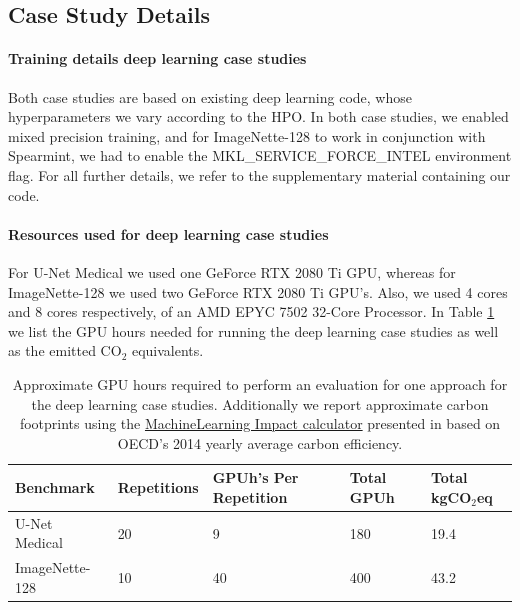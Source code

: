 \subsection{Case Study Details}

\paragraph{Training details deep learning case studies} Both case studies are based on existing deep learning code, whose hyperparameters we vary according to the HPO. In both case studies, we enabled mixed precision training, and for ImageNette-128 to work in conjunction with Spearmint, we had to enable the MKL\_SERVICE\_FORCE\_INTEL environment flag. For all further details, we refer to the supplementary material containing our code.


\paragraph{Resources used for deep learning case studies}
For U-Net Medical we used one GeForce RTX 2080 Ti GPU, whereas for ImageNette-128 we used two GeForce RTX 2080 Ti GPU's. Also, we used 4 cores and 8 cores respectively, of an AMD EPYC 7502 32-Core Processor. In Table \ref{tab:computeused} we list the GPU hours needed for running the deep learning case studies as well as the emitted CO$_2$ equivalents.

\begin{table}[H]
    \begin{center}
        \caption{Approximate GPU hours required to perform an evaluation for one approach for the deep learning case studies. Additionally we report approximate carbon footprints using the \href{https://mlco2.github.io/impact\#compute}{MachineLearning Impact calculator} presented in \cite{lacoste2019quantifying} based on OECD's 2014 yearly average carbon efficiency.}
        \label{tab:computeused}
        \begin{tabular}{lllll}
        \toprule
        \textbf{Benchmark} & \textbf{Repetitions} & \textbf{GPUh's Per Repetition} & \textbf{Total GPUh} & \textbf{Total kgCO$_2$eq} \\\midrule
        U-Net Medical      & 20 & 9 & 180 & 19.4 \\
        ImageNette-128     & 10 & 40 & 400 & 43.2 \\ \bottomrule
        \end{tabular}
    \end{center}
\end{table}


